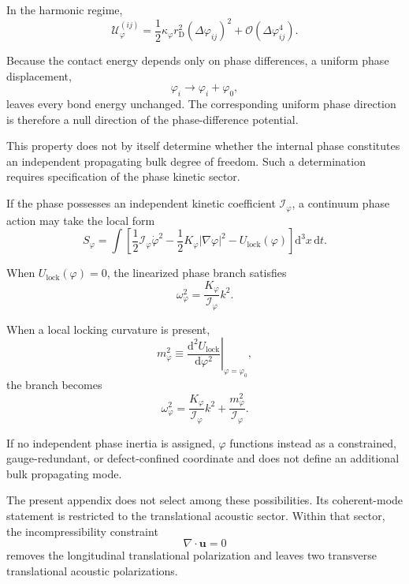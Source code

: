 In the harmonic regime,
\begin{equation}
    \mathcal{U}_{\varphi}^{(ij)} = \frac{1}{2} \kappa_\varphi r_{\mathrm{D}}^2 (\Delta\varphi_{ij})^2 + \mathcal{O}(\Delta\varphi_{ij}^4).
\end{equation}

Because the contact energy depends only on phase differences, a uniform phase displacement,
\begin{equation}
    \varphi_i \rightarrow \varphi_i+\varphi_0,
\end{equation}
leaves every bond energy unchanged. The corresponding uniform phase direction is therefore a null direction of the phase-difference potential.

This property does not by itself determine whether the internal phase constitutes an independent propagating bulk degree of freedom. Such a determination requires specification of the phase kinetic sector.

If the phase possesses an independent kinetic coefficient $\mathcal{I}_\varphi$, a continuum phase action may take the local form
\begin{equation}
    S_\varphi = \int \left[ \frac{1}{2} \mathcal{I}_\varphi \dot{\varphi}^2 - \frac{1}{2} K_\varphi |\nabla\varphi|^2 - U_{\mathrm{lock}}(\varphi) \right] \mathrm{d}^3x \, \mathrm{d}t.
\end{equation}

When $U_{\mathrm{lock}}(\varphi)=0$, the linearized phase branch satisfies
\begin{equation}
    \omega_\varphi^2 = \frac{K_\varphi}{\mathcal{I}_\varphi} k^2.
\end{equation}

When a local locking curvature is present,
\begin{equation}
    m_\varphi^2 \equiv \left. \frac{\mathrm{d}^2U_{\mathrm{lock}}}{\mathrm{d}\varphi^2} \right|_{\varphi=\varphi_0},
\end{equation}
the branch becomes
\begin{equation}
    \omega_\varphi^2 = \frac{K_\varphi}{\mathcal{I}_\varphi} k^2 + \frac{m_\varphi^2}{\mathcal{I}_\varphi}.
\end{equation}

If no independent phase inertia is assigned, $\varphi$ functions instead as a constrained, gauge-redundant, or defect-confined coordinate and does not define an additional bulk propagating mode.

The present appendix does not select among these possibilities. Its coherent-mode statement is restricted to the translational acoustic sector. Within that sector, the incompressibility constraint
\begin{equation}
    \nabla\cdot\mathbf{u}=0
\end{equation}
removes the longitudinal translational polarization and leaves two transverse translational acoustic polarizations.

